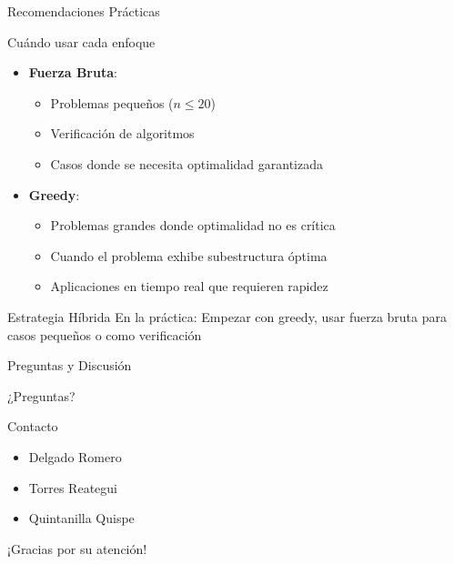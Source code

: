 \documentclass[aspectratio=169]{beamer}
\begin{document}
\begin{frame}{Recomendaciones Prácticas}
\begin{block}{Cuándo usar cada enfoque}
\begin{itemize}
\item \textbf{Fuerza Bruta}: 
\begin{itemize}
\item Problemas pequeños ($n \leq 20$)
\item Verificación de algoritmos
\item Casos donde se necesita optimalidad garantizada
\end{itemize}

\item \textbf{Greedy}:
\begin{itemize}
\item Problemas grandes donde optimalidad no es crítica
\item Cuando el problema exhibe subestructura óptima
\item Aplicaciones en tiempo real que requieren rapidez
\end{itemize}
\end{itemize}
\end{block}

\begin{exampleblock}{Estrategia Híbrida}
En la práctica: Empezar con greedy, usar fuerza bruta para casos pequeños o como verificación
\end{exampleblock}
\end{frame}

\begin{frame}{Preguntas y Discusión}
\begin{center}
\Huge ¿Preguntas?
\end{center}

\begin{block}{Contacto}
\begin{itemize}
\item Delgado Romero
\item Torres Reategui 
\item Quintanilla Quispe
\end{itemize}
\end{block}

\begin{center}
¡Gracias por su atención!
\end{center}
\end{frame}
\end{document}

